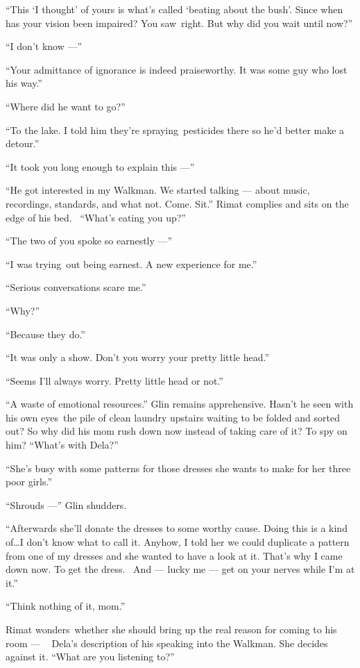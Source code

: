 \documentclass[twoside,11pt,openany]{book}
\begin{document}
``This `I thought' of yours is what's called `beating about the bush'. Since when has your vision been
impaired? You saw~right. But why did you wait until now?''

``I don't know ---''

``Your admittance of ignorance is indeed praiseworthy. It was some guy who lost his way.''

``Where did he want to go?''

``To the lake. I told him they're spraying~pesticides there so he'd better make a detour.''

``It took you long enough to explain this ---''

``He got interested in my Walkman. We started talking --- about music, recordings, standards, and what not.
Come. Sit.'' Rimat complies and sits on the edge of his bed.~ ``What's eating you
up?''

``The two of you spoke so earnestly ---''

``I was trying~out being earnest. A new experience for me.''

``Serious conversations scare me.''

``Why?''

``Because they do.''

``It was only a show. Don't you worry your pretty little  head.''

``Seems I'll always worry. Pretty little head or not.''

``A waste of emotional resources.'' Glin remains apprehensive. Hasn't he seen with his own
eyes~the pile of clean laundry upstairs waiting to be folded and sorted out? So why did his mom rush down now instead
of taking care of it? To spy on him? ``What's with Dela?''

``She's busy with some patterns for those dresses she wants to make for her three poor
girls.''

``Shrouds ---'' Glin shudders.

``Afterwards she'll donate the dresses to some worthy cause. Doing this is a kind of{\ldots}I don't know
what to call it. Anyhow, I told her we could duplicate a pattern from one of my dresses and she wanted to have a look at
it. That's why I came down now. To get the dress. ~And --- lucky me --- get on your nerves while I'm at it.''

``Think nothing of it, mom.''

Rimat wonders~whether she should bring up the real reason for coming to his room --- ~ Dela's description of his speaking
into the Walkman. She decides against it. ``What are you listening to?''
\end{document}
